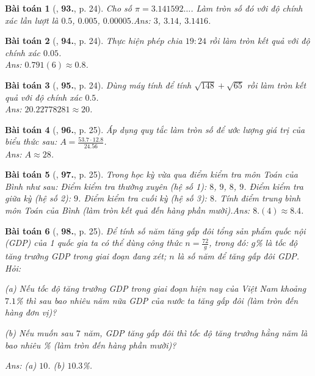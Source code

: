 \documentclass{article}
\numberwithin{equation}{section}
\newtheorem{baitoan}{Bài toán}
\begin{document}
\begin{baitoan}[\cite{Tuyen_Toan_7}, \textbf{93.}, p. 24]
	Cho số $\pi = 3.141592\ldots$. Làm tròn số đó với độ chính xác lần lượt là $0.5$, $0.005$, $0.00005$.\hfill\textsf{Ans:} $3$, $3.14$, $3.1416$.
\end{baitoan}

\begin{baitoan}[\cite{Tuyen_Toan_7}, \textbf{94.}, p. 24]
	Thực hiện phép chia $19:24$ rồi làm tròn kết quả với độ chính xác $0.05$.\\\mbox{}\hfill\textsf{Ans:} $0.791(6)\approx0.8$.
\end{baitoan}

\begin{baitoan}[\cite{Tuyen_Toan_7}, \textbf{95.}, p. 24]
	Dùng máy  tính để tính $\sqrt{148} + \sqrt{65}$ rồi làm tròn kết quả với độ chính xác $0.5$.\\\mbox{}\hfill\textsf{Ans:} $20.22778281\approx20$.
\end{baitoan}

\begin{baitoan}[\cite{Tuyen_Toan_7}, \textbf{96.}, p. 25]
	Áp dụng quy tắc làm tròn số để ước lượng giá trị của biểu thức sau: $A = \frac{53.7\cdot 12.8}{24.56}$.\\\mbox{}\hfill\textsf{Ans:} $A\approx 28$.
\end{baitoan}

\begin{baitoan}[\cite{Tuyen_Toan_7}, \textbf{97.}, p. 25]
	Trong học kỳ vừa qua điểm kiểm tra môn Toán của Bình như sau: Điểm kiểm tra thường xuyên (hệ số 1): $8$, $9$, $8$, $9$. Điểm kiểm tra giữa kỳ (hệ số 2): $9$. Điểm kiểm tra cuối kỳ (hệ số 3): $8$. Tính điểm trung bình môn Toán của Bình (làm tròn kết quả đến hàng phần mười).\hfill\textsf{Ans:} $8.(4)\approx8.4$.
\end{baitoan}

\begin{baitoan}[\cite{Tuyen_Toan_7}, \textbf{98.}, p. 25]
	Để tính số năm tăng gấp đôi tổng sản phẩm quốc nội (GDP) của 1 quốc gia ta có thể dùng công thức $n = \frac{72}{g}$, trong đó: $g$\% là \emph{tốc độ tăng trưởng GDP} trong giai đoạn đang xét; $n$ là số năm để tăng gấp đôi GDP. Hỏi:
	\begin{enumerate*}
		\item[(a)] Nếu tốc độ tăng trưởng GDP trong giai đoạn hiện nay của Việt Nam khoảng $7.1$\% thì sau bao nhiêu năm nữa GDP của nước ta tăng gấp đôi (làm tròn đến hàng đơn vị)?
		\item[(b)] Nếu muốn sau $7$ năm, GDP tăng gấp đôi thì tốc độ tăng trưởng hằng năm là bao nhiêu \% (làm tròn đến hàng phần mười)?
	\end{enumerate*}\hfill\textsf{Ans:} (a) $10$. (b) $10.3$\%.
\end{baitoan}
\end{document}
